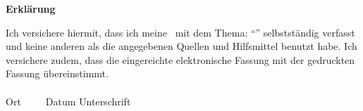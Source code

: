 \newpage
\thispagestyle{empty}
\begin{mdframed}[innertopmargin=2em, innerbottommargin=1em]
  \begin{center}
    \Large\bfseries Erklärung
  \end{center}
  \vspace{1em}
  \noindent
  Ich versichere hiermit, dass ich meine \Was\ mit dem Thema:
  \enquote{\Titel}
  selbstständig verfasst und keine anderen als die angegebenen Quellen und Hilfsmittel benutzt habe.
  Ich versichere zudem, dass die eingereichte elektronische Fassung mit der gedruckten Fassung übereinstimmt.\\[3cm]
  \underline{\hspace{4cm}} \hfill \underline{\hspace{6cm}}\\[0.2cm]
  Ort~~~~~Datum \hfill Unterschrift \hspace{3.7cm}
\end{mdframed}